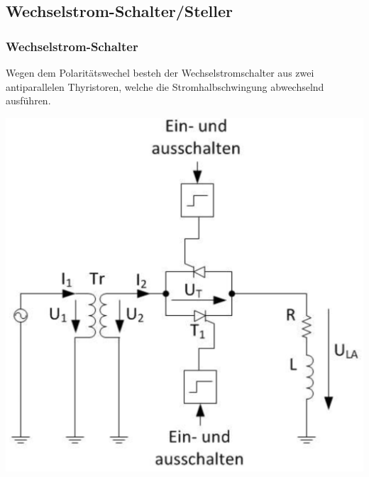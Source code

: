 \subsection{Wechselstrom-Schalter/Steller}
\subsubsection{Wechselstrom-Schalter}
\begin{minipage}{\linewidth}
    Wegen dem Polaritätswechel besteh der Wechselstromschalter aus zwei antiparallelen Thyristoren, welche die Stromhalbschwingung abwechselnd ausführen.
\end{minipage}

\begin{minipage}{0.3\linewidth}
    \includegraphics[width=\linewidth]{images/SchemaWSSchalter}
\end{minipage}
